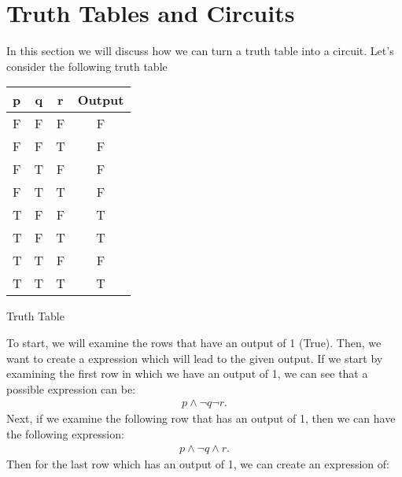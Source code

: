 \documentclass{report}
\begin{document}
    \pagebreak \bigbreak \noindent 
    \section{Truth Tables and Circuits}
    \bigbreak \noindent 
    \begin{minipage}{0.47\textwidth}
    In this section we will discuss how we can turn a truth table into a circuit. Let's consider the following truth table
    \end{minipage}
    \begin{minipage}{0.47\textwidth}
            \bigbreak \noindent 
    \begin{center}
        \begin{tabular}{|l|c|c|c|}
            \hline
            p&q&r&Output\\
        	    \hline
            F&F&F&F   \\
            \hline
            F & F &T&F\\
            \hline
            F &T&F&F \\
            \hline
            F&T&T&F \\
            \hline
            T &F&F&T \\
            \hline 
            T&F&T&T \\
            \hline
            T&T&F&F \\
            \hline
            T& T&T&T\\
            \hline
        \end{tabular}
        \bigbreak \noindent 
    \caption{Truth Table}
    \label{fig:truth_table}
    \end{center}
    \end{minipage}
    \bigbreak \noindent 
    To start, we will examine the rows that have an output of 1 (True).
    Then, we want to create a expression which will lead to the given output. If we start by examining the first row in which we have an output of 1, we can see that a possible expression can be:
    \begin{align*}
         p \land \neg q  \neg r
    .\end{align*}
    \bigbreak \noindent 
    Next, if we examine the following row that has an output of 1, then we can have the following expression:
    \begin{align*}
        p \land \neg q \land r
    .\end{align*}
    \bigbreak \noindent 
    Then for the last row which has an output of 1, we can create an expression of:
\end{document}
